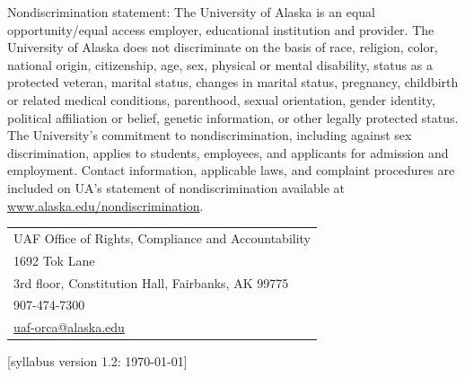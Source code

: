 \documentclass[12pt]{article}
\begin{document}
Nondiscrimination statement: The University of Alaska is an equal opportunity/equal access employer, educational institution and provider. The University of Alaska does not discriminate on the basis of race, religion, color, national origin, citizenship, age, sex, physical or mental disability, status as a protected veteran, marital status, changes in marital status, pregnancy, childbirth or related medical conditions, parenthood, sexual orientation, gender identity, political affiliation or belief, genetic information, or other legally protected status. The University's commitment to nondiscrimination, including against sex discrimination, applies to students, employees, and applicants for admission and employment. Contact information, applicable laws, and complaint procedures are included on UA's statement of nondiscrimination available at \url{www.alaska.edu/nondiscrimination}.

\begin{tabular}{l}
UAF Office of Rights, Compliance and Accountability\\
1692 Tok Lane\\
3rd floor, Constitution Hall, Fairbanks, AK 99775\\
907-474-7300\\
\url{uaf-orca@alaska.edu}
\end{tabular}

\hfill  \scriptsize [syllabus version 1.2: \today] \normalsize
\end{document}

